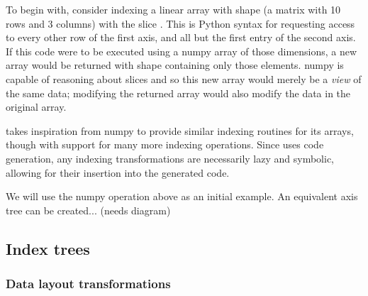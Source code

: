 \documentclass[thesis]{subfiles}
\begin{document}
To begin with, consider indexing a linear array with shape  (a matrix with 10 rows and 3 columns) with the slice \pycode{[::2, 1:]}.
This is Python syntax for requesting access to every other row of the first axis, and all but the first entry of the second axis.
If this code were to be executed using a numpy array of those dimensions, a new array would be returned with shape  containing only those elements.
numpy is capable of reasoning about slices and so this new array would merely be a \textit{view} of the same data; modifying the returned array would also modify the data in the original array.

 takes inspiration from numpy to provide similar indexing routines for its arrays, though with support for many more indexing operations.
Since  uses code generation, any indexing transformations are necessarily lazy and symbolic, allowing for their insertion into the generated code.

We will use the numpy operation above as an initial example.
An equivalent axis tree can be created... (needs diagram)



\subsection{Index trees}
\label{sec:index_trees}



\subsubsection{Data layout transformations}

\end{document}
